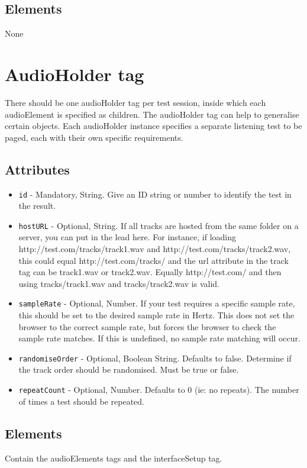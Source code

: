 \documentclass{article}
\begin{document}
\subsection{Elements}
None

\section{AudioHolder tag}

There should be one audioHolder tag per test session, inside which each audioElement is specified as children. The audioHolder tag can help to generalise certain objects. Each audioHolder instance specifies a separate listening test to be paged, each with their own specific requirements.

\subsection{Attributes}
\begin{itemize}
\item \texttt{id} - Mandatory, String. Give an ID string or number to identify the test in the result.
\item \texttt{hostURL} - Optional, String. If all tracks are hosted from the same folder on a server, you can put in the lead here. For instance, if loading http://test.com/tracks/track1.wav and http://test.com/tracks/track2.wav, this could equal http://test.com/tracks/ and the url attribute in the track tag can be track1.wav or track2.wav. Equally http://test.com/ and then using tracks/track1.wav and tracks/track2.wav is valid.
\item \texttt{sampleRate} - Optional, Number. If your test requires a specific sample rate, this should be set to the desired sample rate in Hertz. This does not set the browser to the correct sample rate, but forces the browser to check the sample rate matches. If this is undefined, no sample rate matching will occur.
\item \texttt{randomiseOrder} - Optional, Boolean String. Defaults to false. Determine if the track order should be randomised. Must be true or false.
\item \texttt{repeatCount} - Optional, Number. Defaults to 0 (ie: no repeats). The number of times a test should be repeated.
\end{itemize}

\subsection{Elements}
Contain the audioElements tags and the interfaceSetup tag.
\end{document}
